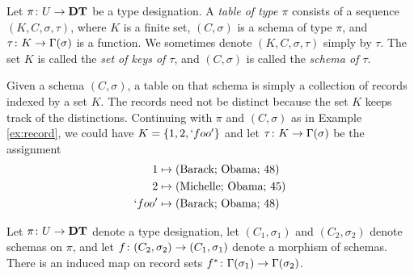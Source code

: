 \documentclass{amsart}
\def\DT{{\bf DT}}
\begin{document}
\begin{definition}\label{def:tables}

Let $\pi\taking U\to\DT$ be a type designation.  A {\em table of type $\pi$} consists of a sequence $(K,C,\sigma,\tau)$, where $K$ is a finite set, $(C,\sigma)$ is a schema of type $\pi$,  and $\tau\colon K\rightarrow\Gamma(\sigma)$ is a function.  We sometimes denote $(K,C,\sigma,\tau)$ simply by $\tau$.  The set $K$ is called the {\em set of keys of $\tau$}, and $(C,\sigma)$ is called the {\em schema of $\tau$}.

\end{definition}

\begin{example}\label{ex:table}

Given a schema $(C,\sigma)$, a table on that schema is simply a collection of records indexed by a set $K$.  The records need not be distinct because the set $K$ keeps track of the distinctions.  Continuing with $\pi$ and $(C,\sigma)$ as in Example \ref{ex:record}, we could have $K=\{1,2,`foo'\}$ and let $\tau\colon K\rightarrow\Gamma(\sigma)$ be the assignment \begin{align*} 1&\mapsto \textnormal{(Barack; Obama; 48)}\\2&\mapsto \textnormal{(Michelle; Obama; 45)}\\ `foo'&\mapsto\textnormal{(Barack; Obama; 48)}\end{align*}

\end{example}

\begin{lemma}\label{induced morphisms}

Let $\pi\taking U\to\DT$ denote a type designation, let $(C_1,\sigma_1)$ and $(C_2,\sigma_2)$ denote schemas on $\pi$, and let $f\colon (C_2,\sigma_2)\rightarrow (C_1,\sigma_1)$ denote a morphism of schemas.  There is an induced map on record sets $f^*\colon \Gamma(\sigma_1)\rightarrow\Gamma(\sigma_2)$.

\end{lemma}
\end{document}
